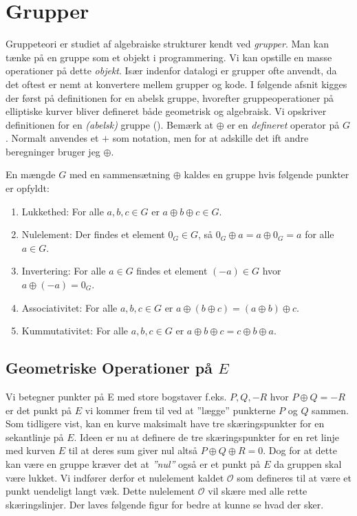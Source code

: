 \section{Grupper}
Gruppeteori er studiet af algebraiske strukturer kendt ved \textit{grupper}. Man kan tænke på en gruppe som et objekt i programmering. Vi kan opstille en masse operationer på dette \textit{objekt}. Især indenfor datalogi er grupper ofte anvendt, da det oftest er nemt at konvertere mellem grupper og kode. I følgende afsnit kigges der først på definitionen for en abelsk gruppe, hvorefter gruppeoperationer på elliptiske kurver bliver defineret både geometrisk og algebraisk.
Vi opskriver definitionen for en \textit{(abelsk)} gruppe (\cite{michaelknudsen2005}). Bemærk at $\oplus$ er en \textit{defineret} operator på $G$. Normalt anvendes et $+$ som notation, men for at adskille det ift andre beregninger bruger jeg $\oplus$.

\begin{mdframed}[frametitle={Definition for en abelsk gruppe}]
En mængde $G$ med en sammensætning $\oplus$ kaldes en gruppe hvis følgende punkter er opfyldt:
\begin{enumerate}\label{tab:definition_af_gruppe}
    \item Lukkethed: For alle $a, b, c \in G$ er $a\oplus b \oplus c\in G$.
    \item Nulelement: Der findes et element $0_{G} \in G$, så $0_{G}\oplus a=a \oplus 0_{G}=a$ for alle $a \in G$.
    \item Invertering: For alle $a\in G$ findes et element $(-a)\in G$ hvor $a\oplus (-a)=0_{G}$.
    \item Associativitet: For alle $a,b,c \in G$ er $a\oplus (b \oplus c)=(a \oplus b)\oplus c$.
    \item Kummutativitet: For alle $a,b,c \in G$ er $a\oplus b \oplus c= c \oplus b \oplus a$.
\end{enumerate}
\end{mdframed}


\subsection{Geometriske Operationer på $E$}
Vi betegner punkter på E med store bogstaver f.eks. $P, Q, -R$ hvor $P \oplus Q=-R$ er det punkt på $E$ vi kommer frem til ved at ”lægge” punkterne $P$ og $Q$ sammen. Som tidligere vist, kan en kurve maksimalt have tre skæringspunkter for en sekantlinje på $E$. Ideen er nu at definere de tre skæringspunkter for en ret linje med kurven $E$ til at deres sum giver nul altså $P \oplus Q \oplus R=0$. Dog for at dette kan være en gruppe kræver det at \textit{”nul”} også er et punkt på $E$ da gruppen skal være lukket. Vi indfører derfor et nulelement kaldet $\mathcal{O}$ som defineres til at være et punkt uendeligt langt væk. Dette nulelement $\mathcal{O}$ vil skære med alle rette skæringslinjer. Der laves følgende figur for bedre at kunne se hvad der sker.

